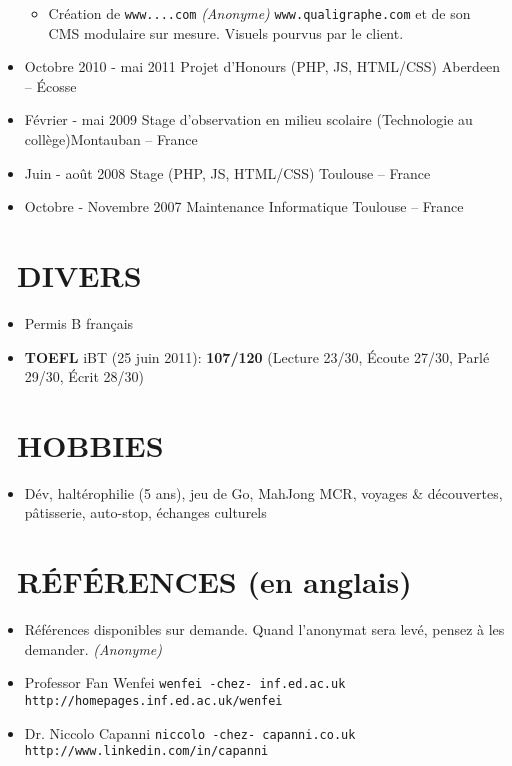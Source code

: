 \documentclass{res}
\begin{document}
\begin{resume}
\begin{itemize}
		\begin{itemize}
			\item[] Cr\'eation de \ifisanon \texttt{www....com} \textit{(Anonyme)} \else \texttt{www.qualigraphe.com} \fi et de son CMS modulaire sur mesure. Visuels pourvus par le client.
		\end{itemize}
		\item[] Octobre 2010 - mai 2011 \tabto{5cm} Projet d'Honours (PHP, JS, HTML/CSS) \hfill Aberdeen -- \'Ecosse
		\item[] F\'evrier - mai 2009 \tabto{5cm} Stage d'observation en milieu scolaire (Technologie au coll\`ege)\hfill Montauban -- France
		\item[] Juin - ao\^ut 2008 \tabto{5cm} Stage (PHP, JS, HTML/CSS) \hfill Toulouse -- France
		\item[] Octobre - Novembre 2007 \tabto{5cm} Maintenance Informatique \hfill Toulouse -- France
	\end{itemize}
		
\section{\faMagic~DIVERS}
	\begin{itemize}
		\item[] Permis B fran\c{c}ais
		\item[] \textbf{TOEFL} iBT (25 juin 2011): \textbf{107/120} (Lecture 23/30, \'Ecoute 27/30, Parl\'e 29/30, \'Ecrit 28/30)		
		    \end{itemize} 
 
\section{\faGamepad~HOBBIES}
	\begin{itemize}
		\item[] D\'ev, halt\'erophilie (5 ans), jeu de Go, MahJong MCR, voyages \& d\'ecouvertes, p\^atisserie, auto-stop, \'echanges culturels
	\end{itemize}

\section{\faUserCheck~R\'EF\'ERENCES (en anglais)}
\ifisanon 
    \begin{itemize}
			\item[] R\'ef\'erences disponibles sur demande. Quand l'anonymat sera lev\'e, pensez \`a les demander. \textit{(Anonyme)}
    \end{itemize}
\else
		\begin{itemize}
			\item[] Professor Fan Wenfei \tabto{4cm} \texttt{wenfei -chez- inf.ed.ac.uk} \hfill \texttt{http://homepages.inf.ed.ac.uk/wenfei}
			\item[] Dr. Niccolo Capanni \tabto{4cm} \texttt{niccolo -chez- capanni.co.uk} \hfill \texttt{http://www.linkedin.com/in/capanni}
		\end{itemize}
\fi
\end{resume}
\end{document}
